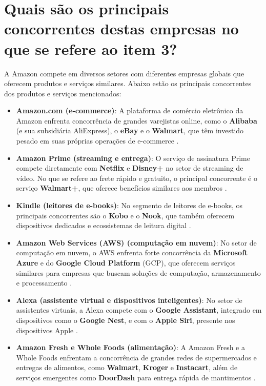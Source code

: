 \section{Quais são os principais concorrentes destas empresas no que se refere ao item 3?}

A Amazon compete em diversos setores com diferentes empresas globais que oferecem produtos e serviços similares. Abaixo estão os principais concorrentes dos produtos e serviços mencionados:

\begin{itemize}
    \item \textbf{Amazon.com (e-commerce)}: A plataforma de comércio eletrônico da Amazon enfrenta concorrência de grandes varejistas online, como o \textbf{Alibaba} (e sua subsidiária AliExpress), o \textbf{eBay} e o \textbf{Walmart}, que têm investido pesado em suas próprias operações de e-commerce \cite{competitors2023ecommerce}.

    \item \textbf{Amazon Prime (streaming e entrega)}: O serviço de assinatura Prime compete diretamente com \textbf{Netflix} e \textbf{Disney+} no setor de streaming de vídeo. No que se refere ao frete rápido e gratuito, o principal concorrente é o serviço \textbf{Walmart+}, que oferece benefícios similares aos membros \cite{streaming2024comparison}.

    \item \textbf{Kindle (leitores de e-books)}: No segmento de leitores de e-books, os principais concorrentes são o \textbf{Kobo} e o \textbf{Nook}, que também oferecem dispositivos dedicados e ecossistemas de leitura digital \cite{kindleCompetitors2024}.

    \item \textbf{Amazon Web Services (AWS) (computação em nuvem)}: No setor de computação em nuvem, o AWS enfrenta forte concorrência da \textbf{Microsoft Azure} e do \textbf{Google Cloud Platform} (GCP), que oferecem serviços similares para empresas que buscam soluções de computação, armazenamento e processamento \cite{awsCompetitors2024}.

    \item \textbf{Alexa (assistente virtual e dispositivos inteligentes)}: No setor de assistentes virtuais, a Alexa compete com o \textbf{Google Assistant}, integrado em dispositivos como o \textbf{Google Nest}, e com o \textbf{Apple Siri}, presente nos dispositivos Apple \cite{alexa2024competitors}.

    \item \textbf{Amazon Fresh e Whole Foods (alimentação)}: A Amazon Fresh e a Whole Foods enfrentam a concorrência de grandes redes de supermercados e entregas de alimentos, como \textbf{Walmart}, \textbf{Kroger} e \textbf{Instacart}, além de serviços emergentes como \textbf{DoorDash} para entrega rápida de mantimentos \cite{groceryCompetitors2024}.


\end{itemize}
